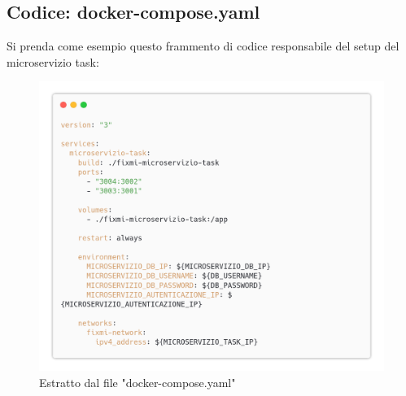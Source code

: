 \documentclass{report}
\begin{document}
\subsection{Codice: docker-compose.yaml}

Si prenda come esempio questo frammento di codice responsabile del setup del microservizio task:
\begin{figure}[H]
	\centering\includegraphics[width=1\textwidth]{images/docker_code_01.png}
	Estratto dal file "docker-compose.yaml"
\end{figure}
\end{document}
